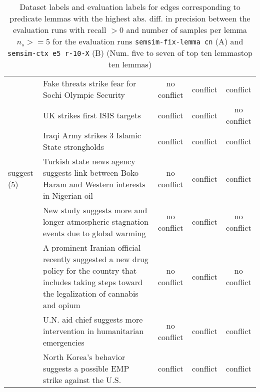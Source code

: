 \begin{sidewaystable}[ht]
\begin{tabular}{l p{13cm} ccc}
& Fake threats strike fear for Sochi Olympic Security & no conflict & conflict & conflict \\
& UK strikes first ISIS targets & conflict & conflict & no conflict \\
& Iraqi Army strikes 3 Islamic State strongholds & conflict & conflict & conflict \\
\hline
suggest (5)
& Turkish state news agency suggests link between Boko Haram and Western interests in Nigerian oil & no conflict & conflict & conflict \\
& New study suggests more and longer atmospheric stagnation events due to global warming & no conflict & conflict & no conflict \\
& A prominent Iranian official recently suggested a new drug policy for the country that includes taking steps toward the legalization of cannabis and opium & no conflict & conflict & no conflict \\
& U.N. aid chief suggests more intervention in humanitarian emergencies & no conflict & conflict & conflict \\
& North Korea's behavior suggests a possible EMP strike against the U.S. & conflict & conflict & conflict \\
\bottomrule
\end{tabular}
\caption{Dataset labels and evaluation labels for edges corresponding to predicate lemmas with the highest abs. diff. in precision between the evaluation runs with recall \(> 0\) and number of samples per lemma \(n_s >= 5\) for the evaluation runs \texttt{semsim-fix-lemma cn} (A) and \texttt{semsim-ctx e5 r-10-X} (B) (Num. five to seven of top ten lemmastop ten lemmas)}
\end{sidewaystable}


